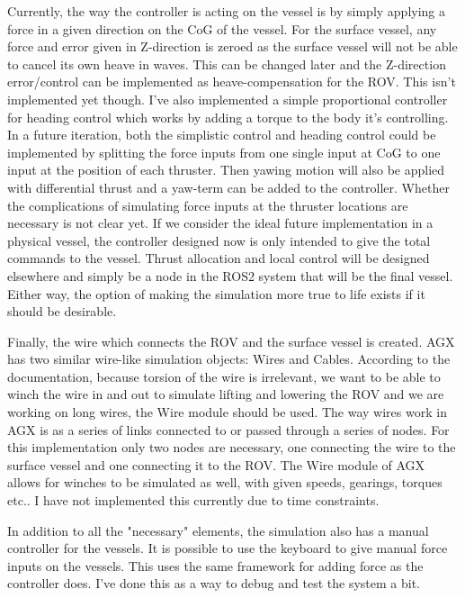 Currently, the way the controller is acting on the vessel is by simply applying a force in a given direction on the CoG of the vessel. For the surface vessel, any force and error given in Z-direction is zeroed as the surface vessel will not be able to cancel its own heave in waves. This can be changed later and the Z-direction error/control can be implemented as heave-compensation for the ROV. This isn't implemented yet though. I've also implemented a simple proportional controller for heading control which works by adding a torque to the body it's controlling. In a future iteration, both the simplistic control and heading control could be implemented by splitting the force inputs from one single input at CoG to one input at the position of each thruster. Then yawing motion will also be applied with differential thrust and a yaw-term can be added to the controller. Whether the complications of simulating force inputs at the thruster locations are necessary is not clear yet. If we consider the ideal future implementation in a physical vessel, the controller designed now is only intended to give the total commands to the vessel. Thrust allocation and local control will be designed elsewhere and simply be a node in the ROS2 system that will be the final vessel. Either way, the option of making the simulation more true to life exists if it should be desirable. 

Finally, the wire which connects the ROV and the surface vessel is created. AGX has two similar wire-like simulation objects: Wires and Cables. According to the documentation, because torsion of the wire is irrelevant, we want to be able to winch the wire in and out to simulate lifting and lowering the ROV and we are working on long wires, the Wire module should be used. The way wires work in AGX is as a series of links connected to or passed through a series of nodes. For this implementation only two nodes are necessary, one connecting the wire to the surface vessel and one connecting it to the ROV. The Wire module of AGX allows for winches to be simulated as well, with given speeds, gearings, torques etc.. I have not implemented this currently due to time constraints. 

In addition to all the "necessary" elements, the simulation also has a manual controller for the vessels. It is possible to use the keyboard to give manual force inputs on the vessels. This uses the same framework for adding force as the controller does. I've done this as a way to debug and test the system a bit.

